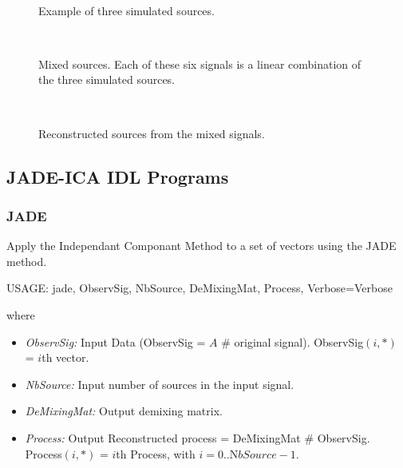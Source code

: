 \begin{figure}[htb]
\centerline{
\hbox{ 
}}
\caption{Example of three simulated sources.}
\label{fig_ica1}
\end{figure}

\begin{figure}[htb]
\centerline{
\hbox{ 
}}
\caption{Mixed sources. Each of these six signals is a linear combination
of the three simulated sources.}
\label{fig_ica2}
\end{figure}

\begin{figure}[htb]
\centerline{
\hbox{ 
}}
\caption{Reconstructed sources from the mixed signals.}
\label{fig_ica3}
\end{figure}

\subsection{JADE-ICA IDL Programs}
 
\subsubsection{JADE}
\label{jade}
 Apply the Independant Componant Method to a set of vectors using
the JADE method.
{\bf
\begin{center}
 USAGE:  jade, ObservSig, NbSource, DeMixingMat, Process, Verbose=Verbose
\end{center}}
where
\begin{itemize}
\item {\em  ObservSig:} Input Data (ObservSig = $A$ \# original signal).
ObservSig$(i,*)$ = $i$th vector.
\item {\em  NbSource:}  Input number of sources in the input signal.
\item {\em DeMixingMat:} Output demixing matrix.
\item {\em Process:} Output Reconstructed process = DeMixingMat \# ObservSig.
Process$(i, *)$ = $i$th Process, with $i = 0.. {\mathrm NbSource} - 1$.
\end{itemize}


